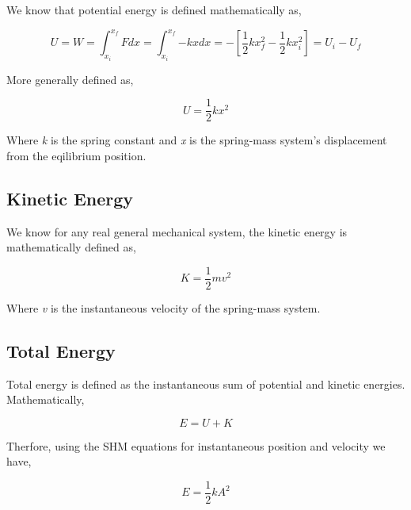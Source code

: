 		{We know that potential energy is defined mathematically as,}
		
			$$U = W = \int_{x_{i}}^{x_{f}}{F}dx = \int_{x_{i}}^{x_{f}}{-kx}dx = -\left[\frac{1}{2}kx_{f}^2 - \frac{1}{2}kx_{i}^2\right] = U_{i} - U_{f}$$		
		
		{More generally defined as,}		
		
			$$U = \frac{1}{2}kx^2$$		
		
		{Where \textit{k} is the spring constant and \textit{x} is the spring-mass system's displacement from the eqilibrium position.}		
		
	\subsection{{Kinetic Energy}}
	
		{We know for any real general mechanical system, the kinetic energy is mathematically defined as,}
	
			$$K = \frac{1}{2}mv^2$$	
	
		{Where \textit{v} is the instantaneous velocity of the spring-mass system.}	
	
	\subsection{{Total Energy}}
	
		{Total energy is defined as the instantaneous sum of potential and kinetic energies. Mathematically,}
	
			$$E = U + K$$

		{Therfore, using the SHM equations for instantaneous position and velocity we have,}

			$$E = \frac{1}{2}kA^2$$

			
			